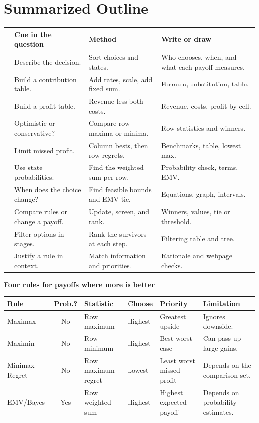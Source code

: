 \section{Summarized Outline}\label{sec:summary}
{\small
\begin{tabularx}{\linewidth}{@{}l L L L@{}}
\toprule
& \textbf{Cue in the question} & \textbf{Method} & \textbf{Write or draw}\\
\midrule
{} & Describe the decision. & Sort choices and states. & Who chooses, when, and what each payoff measures.\\
 & Build a contribution table. & Add rates, scale, add fixed sum. & Formula, substitution, table.\\
 & Build a profit table. & Revenue less both costs. & Revenue, costs, profit by cell.\\
 & Optimistic or conservative? & Compare row maxima or minima. & Row statistics and winners.\\
 & Limit missed profit. & Column bests, then row regrets. & Benchmarks, table, lowest max.\\
 & Use state probabilities. & Find the weighted sum per row. & Probability check, terms, EMV.\\
 & When does the choice change? & Find feasible bounds and EMV tie. & Equations, graph, intervals.\\
 & Compare rules or change a payoff. & Update, screen, and rank. & Winners, values, tie or threshold.\\
 & Filter options in stages. & Rank the survivors at each step. & Filtering table and tree.\\
 & Justify a rule in context. & Match information and priorities. & Rationale and webpage checks.\\
\bottomrule
\end{tabularx}

\medskip
\textbf{Four rules for payoffs where more is better}
\par\smallskip
\begin{tabularx}{\linewidth}{@{}l c L l L L@{}}
\toprule
\textbf{Rule} & \textbf{Prob.?} & \textbf{Statistic} & \textbf{Choose} & \textbf{Priority} & \textbf{Limitation}\\
\midrule
Maximax & No & Row maximum & Highest & Greatest upside & Ignores downside.\\
Maximin & No & Row minimum & Highest & Best worst case & Can pass up large gains.\\
Minimax Regret & No & Row maximum regret & Lowest & Least worst missed profit & Depends on the comparison set.\\
EMV/Bayes & Yes & Row weighted sum & Highest & Highest expected payoff & Depends on probability estimates.\\
\bottomrule
\end{tabularx}

}
